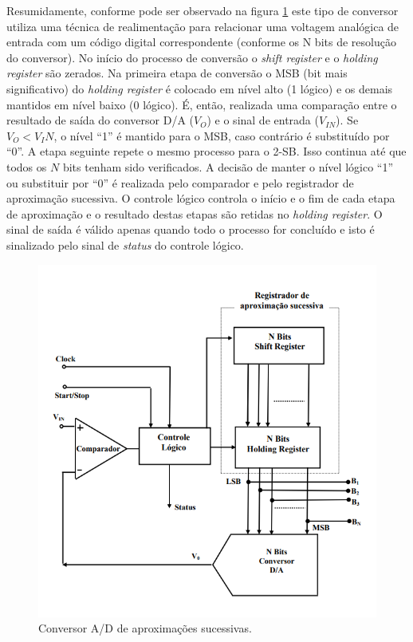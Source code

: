 		Resumidamente, conforme pode ser observado na figura \ref{conv-aprox-sucessivas1} este tipo de conversor utiliza uma técnica de realimentação para relacionar uma voltagem analógica de entrada com um código digital correspondente (conforme os N bits de resolução do conversor). No início do processo de conversão o \textit{shift register} e o \textit{holding register} são zerados. Na primeira etapa de conversão o MSB (bit mais significativo) do \textit{holding register} é colocado em	nível alto (1 lógico) e os demais mantidos em nível baixo (0 lógico). É, então, realizada uma comparação entre o resultado de saída do conversor D/A ($V_O$) e o sinal de entrada ($V_{IN}$). Se $V_O < V_IN$, o nível “1” é mantido para o MSB, caso contrário é substituído por “0”. A etapa seguinte repete o mesmo processo para o 2-SB. Isso continua até que todos os $N$ bits tenham sido verificados. A decisão de manter o nível lógico “1” ou substituir por “0” é realizada pelo comparador e pelo registrador de aproximação sucessiva. O controle lógico controla o início e o fim de cada etapa de aproximação e o resultado destas etapas são retidas no \textit{holding register}. O sinal de saída é válido apenas quando todo o processo for concluído e isto é sinalizado pelo sinal de \textit{status} do controle lógico.
		
		\begin{figure}[!ht]
			\centering
				\includegraphics[scale=0.5]{./figuras/aprox-sucessivas-conv-ad.png}
				\caption{Conversor A/D de aproximações sucessivas.}
				\label{conv-aprox-sucessivas1}
		\end{figure}
	
